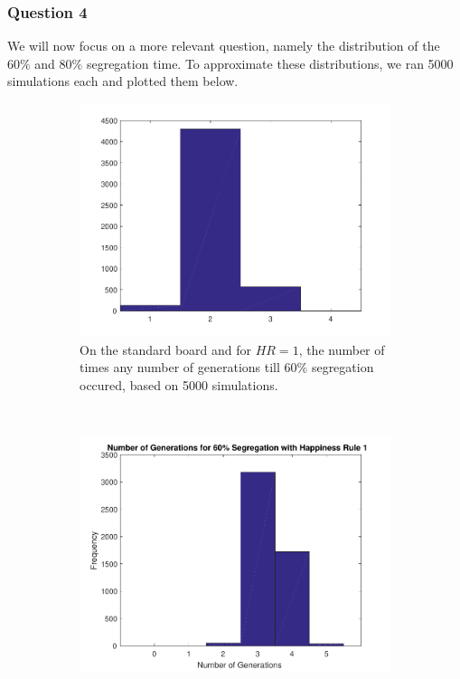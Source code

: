 \subsubsection{Question 4}

We will now focus on a more relevant question, namely the distribution of the $60\%$ and $80\%$ segregation time. To approximate these distributions, we ran 5000 simulations each and plotted them below.
\begin{figure}[H]
\begin{subfigure}{0.4\textwidth}
    \centering
    \includegraphics[width=\textwidth]{./60_80_segregation_aantgen/60_segregation.pdf}
    \caption{On the standard board and for $HR=1$, the number of times any number of generations till $60\%$ segregation occured, based on 5000 simulations.}
    \label{fig:segaantgen_s60}
\end{subfigure}
~
\begin{subfigure}{0.4\textwidth}
    \centering
    \includegraphics[width=\textwidth]{./60_80_segregation_aantgen/4TypeBoard/60_segregation.pdf}

\end{subfigure}
\end{figure}
